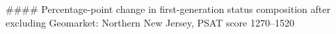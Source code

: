 #### Percentage-point change in first-generation status composition after excluding Geomarket: Northern New Jersey, PSAT score 1270–1520
